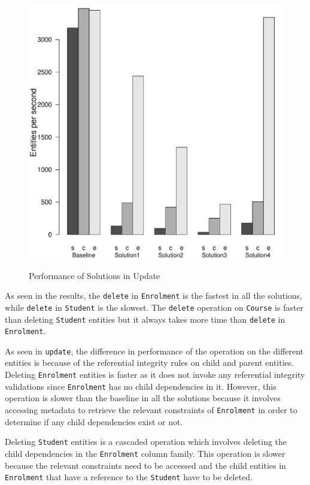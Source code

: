 \begin{figure}[H]
		{\includegraphics[width=\W]{figure/result/barplot-delete-tp.pdf} \label{fres:delete-}\label{fres:Delete-throughput}}
		\caption{Performance of Solutions in Update}\label{fres:Delete}
	\end{figure}
 
As seen in  the results, the \texttt{delete} in \texttt{Enrolment}
is the fastest in all the solutions, while  \texttt{delete} in
\texttt{Student} is the slowest. The \texttt{delete} operation on 
\texttt{Course} is faster than deleting \texttt{Student} entities but it
always takes more time than \texttt{delete} in \texttt{Enrolment}.

As seen in \texttt{update}, the difference in  performance of the operation
on the different entities is because of the referential integrity rules on
child and parent entities. Deleting \texttt{Enrolment} entities is faster as it 
does not invoke any referential integrity validations since \texttt{Enrolment}
has no child dependencies in it.
However, this operation is  slower than the baseline in all the solutions
because it involves accessing metadata to retrieve the relevant constraints of
\texttt{Enrolment} in order to determine if any child dependencies exist or
not.

Deleting \texttt{Student} entities is a cascaded operation which involves
deleting the child dependencies in the \texttt{Enrolment} column family. This
operation is slower because  the relevant constraints need to be  accessed and
the child entities in \texttt{Enrolment}  that have a reference to the
\texttt{Student} have to be deleted. 

